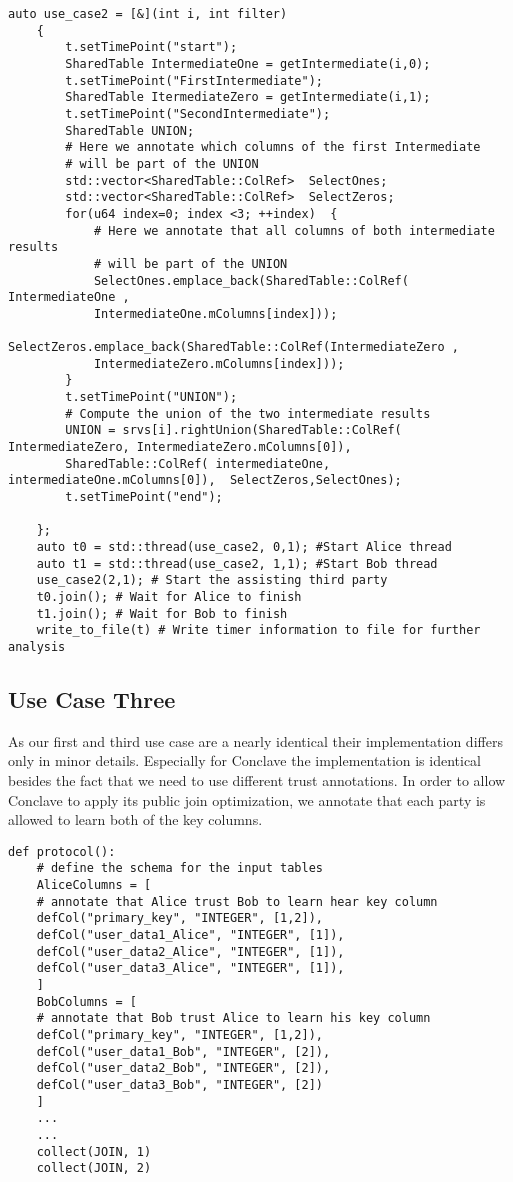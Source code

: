 \label{Listing 5.7}   
\begin{lstlisting}[caption={Simpifiyed Protocol for our second use case in ABY3}]
	auto use_case2 = [&](int i, int filter)
	{
		t.setTimePoint("start"); 
		SharedTable IntermediateOne = getIntermediate(i,0);
		t.setTimePoint("FirstIntermediate"); 
		SharedTable ItermediateZero = getIntermediate(i,1);
		t.setTimePoint("SecondIntermediate");
		SharedTable UNION;
		# Here we annotate which columns of the first Intermediate 
		# will be part of the UNION
		std::vector<SharedTable::ColRef>  SelectOnes; 
		std::vector<SharedTable::ColRef>  SelectZeros; 
		for(u64 index=0; index <3; ++index)  {
			# Here we annotate that all columns of both intermediate results 
			# will be part of the UNION
			SelectOnes.emplace_back(SharedTable::ColRef( IntermediateOne , 
			IntermediateOne.mColumns[index]));
			SelectZeros.emplace_back(SharedTable::ColRef(IntermediateZero , 
			IntermediateZero.mColumns[index]));
		}
		t.setTimePoint("UNION");
		# Compute the union of the two intermediate results
		UNION = srvs[i].rightUnion(SharedTable::ColRef( IntermediateZero, IntermediateZero.mColumns[0]),
		SharedTable::ColRef( intermediateOne, intermediateOne.mColumns[0]),  SelectZeros,SelectOnes);
		t.setTimePoint("end");
		
	};
	auto t0 = std::thread(use_case2, 0,1); #Start Alice thread
	auto t1 = std::thread(use_case2, 1,1); #Start Bob thread
	use_case2(2,1); # Start the assisting third party
	t0.join(); # Wait for Alice to finish
	t1.join(); # Wait for Bob to finish
	write_to_file(t) # Write timer information to file for further analysis
\end{lstlisting}
\subsection{Use Case Three}
As our first and third use case are a nearly identical their implementation differs only in minor details. Especially for Conclave the implementation is identical besides the fact that we need to use different trust annotations. In order to allow Conclave to apply its public join optimization, we annotate that each party is allowed to learn both of the key columns.

\begin{lstlisting}[caption={ The Python protocol of Conclave for our last use case    }]
	def protocol():
	# define the schema for the input tables 
	AliceColumns = [
	# annotate that Alice trust Bob to learn hear key column
	defCol("primary_key", "INTEGER", [1,2]), 
	defCol("user_data1_Alice", "INTEGER", [1]),
	defCol("user_data2_Alice", "INTEGER", [1]),
	defCol("user_data3_Alice", "INTEGER", [1]),
	]
	BobColumns = [
	# annotate that Bob trust Alice to learn his key column
	defCol("primary_key", "INTEGER", [1,2]),
	defCol("user_data1_Bob", "INTEGER", [2]),
	defCol("user_data2_Bob", "INTEGER", [2]),
	defCol("user_data3_Bob", "INTEGER", [2])
	]
	...
	...
	collect(JOIN, 1)
	collect(JOIN, 2)
\end{lstlisting}



